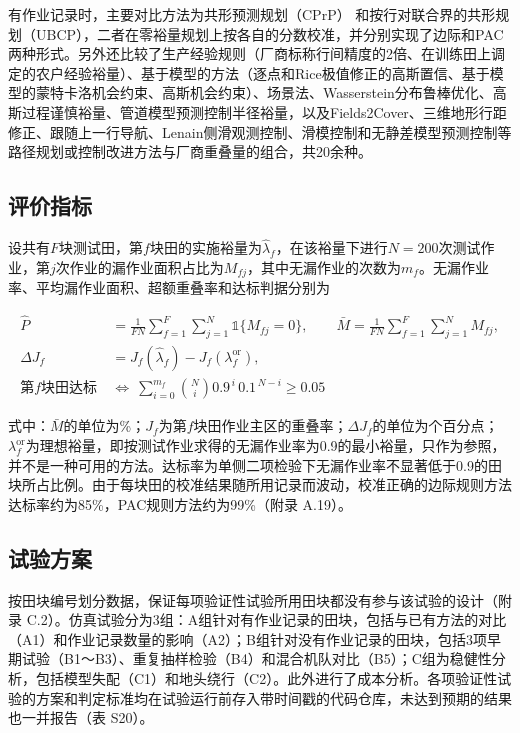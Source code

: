 \documentclass[preprint,12pt,number,sort&compress]{elsarticle}
\begin{document}
有作业记录时，主要对比方法为共形预测规划（CPrP）\citep{zhao2024} 和按行对联合界的共形规划（UBCP）\citep{lindemann2023}，二者在零裕量规划上按各自的分数校准，并分别实现了边际和PAC两种形式。另外还比较了生产经验规则（厂商标称行间精度的2倍、在训练田上调定的农户经验裕量）、基于模型的方法（逐点和Rice极值修正的高斯置信、基于模型的蒙特卡洛机会约束、高斯机会约束）、场景法\citep{campi2008}、Wasserstein分布鲁棒优化\citep{mohajerin2018}、高斯过程谨慎裕量\citep{hewing2020}、管道模型预测控制半径裕量\citep{mayne2005}，以及Fields2Cover、三维地形行距修正、跟随上一行导航、Lenain侧滑观测控制、滑模控制和无静差模型预测控制等路径规划或控制改进方法与厂商重叠量的组合，共20余种。

\subsection{评价指标}

设共有\(F\)块测试田，第\(f\)块田的实施裕量为\(\hat\lambda_f\)，在该裕量下进行\(N=200\)次测试作业，第\(j\)次作业的漏作业面积占比为\(M_{fj}\)，其中无漏作业的次数为\(m_f\)。无漏作业率、平均漏作业面积、超额重叠率和达标判据分别为

\begin{equation}
\begin{aligned}
\hat P&=\frac{1}{FN}\sum_{f=1}^{F}\sum_{j=1}^{N}\mathbb 1\{M_{fj}=0\},\qquad \bar M=\frac{1}{FN}\sum_{f=1}^{F}\sum_{j=1}^{N}M_{fj},\\
\Delta J_f&=J_f(\hat\lambda_f)-J_f(\lambda_f^\mathrm{or}),\\
\text{第}f\text{块田达标}\ &\iff\ \sum_{i=0}^{m_f}\binom{N}{i}0.9^{\,i}\,0.1^{\,N-i}\ge0.05
\end{aligned}
\end{equation}

式中：\(\bar M\)的单位为\%；\(J_f\)为第\(f\)块田作业主区的重叠率；\(\Delta J_f\)的单位为个百分点；\(\lambda_f^\mathrm{or}\)为理想裕量，即按测试作业求得的无漏作业率为0.9的最小裕量，只作为参照，并不是一种可用的方法。达标率为单侧二项检验下无漏作业率不显著低于0.9的田块所占比例。由于每块田的校准结果随所用记录而波动，校准正确的边际规则方法达标率约为85\%，PAC规则方法约为99\%（附录 A.19）。

\subsection{试验方案}

按田块编号划分数据，保证每项验证性试验所用田块都没有参与该试验的设计（附录 C.2）。仿真试验分为3组：A组针对有作业记录的田块，包括与已有方法的对比（A1）和作业记录数量的影响（A2）；B组针对没有作业记录的田块，包括3项早期试验（B1～B3）、重复抽样检验（B4）和混合机队对比（B5）；C组为稳健性分析，包括模型失配（C1）和地头绕行（C2）。此外进行了成本分析。各项验证性试验的方案和判定标准均在试验运行前存入带时间戳的代码仓库，未达到预期的结果也一并报告（表 S20）。
\end{document}
